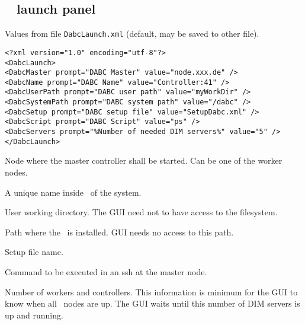 \subsection{\dabc~ launch panel}
Values from file {\tt DabcLaunch.xml} (default, may be saved to other file).
{\small \begin{verbatim}
<?xml version="1.0" encoding="utf-8"?>
<DabcLaunch>
<DabcMaster prompt="DABC Master" value="node.xxx.de" />
<DabcName prompt="DABC Name" value="Controller:41" />
<DabcUserPath prompt="DABC user path" value="myWorkDir" />
<DabcSystemPath prompt="DABC system path" value="/dabc" />
<DabcSetup prompt="DABC setup file" value="SetupDabc.xml" />
<DabcScript prompt="DABC Script" value="ps" />
<DabcServers prompt="%Number of needed DIM servers%" value="5" />
</DabcLaunch>
\end{verbatim}
\bdes
\item[DabcMaster:] Node where the master controller shall be started.
Can be one of the worker nodes.
\item[DabcName:] A unique name inside \dabc\ of the system.
\item[DabcUserPath:] User working directory. The GUI need not to have
access to the filesystem. 
\item[DabcSystemPath:] Path where the \dabc\ is installed. GUI needs no access to this path.
\item[DabcSetup:] Setup file name.
\item[DabcScript:] Command to be executed in an ssh at the master node.
\item[DabcServers:] Number of workers and controllers. This information
is minimum for the GUI to know when all \dabc\ nodes are up. The GUI waits until
this number of DIM servers is up and running.
\edes
}
